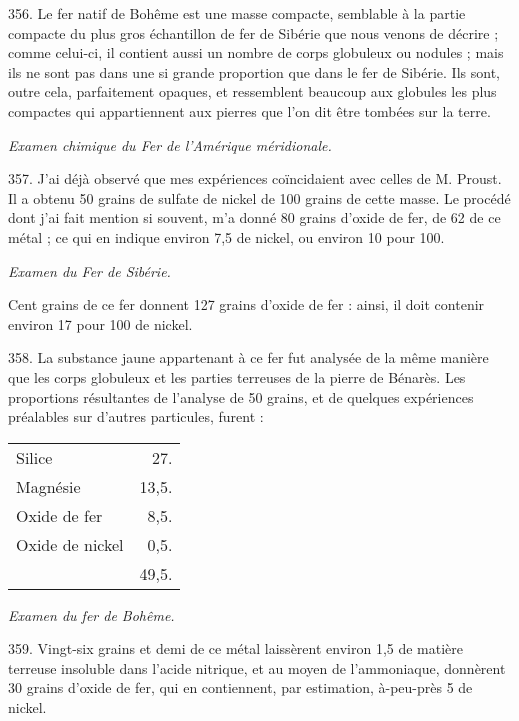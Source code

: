 \documentclass[a4paper, 11pt, oneside, polutonikogreek, french]{article}
\begin{document}
356. Le fer natif de Bohême est une masse compacte, semblable à la partie compacte du plus gros échantillon de fer de Sibérie que nous venons de décrire ; comme celui-ci, il contient aussi un nombre de corps globuleux ou nodules ; mais ils ne sont pas dans une si grande proportion que dans le fer de Sibérie. Ils sont, outre cela, parfaitement opaques, et ressemblent beaucoup aux globules les plus compactes qui appartiennent aux pierres que l'on dit être tombées sur la terre.

\begin{center}
\emph{Examen chimique du Fer de l'Amérique méridionale.}
\end{center}

357. J'ai déjà observé que mes expériences coïncidaient avec celles de M. Proust. Il a obtenu 50 grains de sulfate de nickel de 100 grains de cette masse. Le procédé dont j'ai fait mention si souvent, m'a donné 80 grains d'oxide de fer, de 62 de ce métal ; ce qui en indique environ 7,5 de nickel, ou environ 10 pour 100.

\begin{center}
\emph{Examen du Fer de Sibérie.}
\end{center}

Cent grains de ce fer donnent 127 grains d'oxide de fer : ainsi, il doit contenir environ 17 pour 100 de nickel.

358. La substance jaune appartenant à ce fer fut analysée de la même manière que les corps globuleux et les parties terreuses de la pierre de Bénarès. Les proportions résultantes de l'analyse de 50 grains, et de quelques expériences préalables sur d'autres particules, furent :

\begin{table}[!ht]
    \centering
    \begin{tabular}{l r}
        Silice & 27. \\
        Magnésie & 13,5. \\
        Oxide de fer & 8,5. \\
        Oxide de nickel & 0,5. \\ \hline
        ~ & 49,5. \\
    \end{tabular}
\end{table}

\begin{center}
\emph{Examen du fer de Bohême.}
\end{center}

359. Vingt-six grains et demi de ce métal laissèrent environ 1,5 de matière terreuse insoluble dans l'acide nitrique, et au moyen de l'ammoniaque, donnèrent 30 grains d'oxide de fer, qui en contiennent, par estimation, à-peu-près 5 de nickel.
\end{document}
